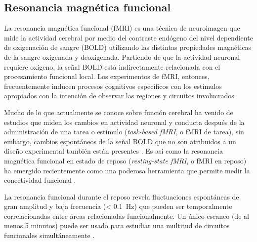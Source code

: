 \subsection{Resonancia magnética funcional}
La resonancia magnética funcional (fMRI) es una técnica de neuroimagen que mide la actividad cerebral por medio del contraste endógeno del nivel dependiente de oxigenación de sangre (BOLD) \parencite{Ogawa1993} utilizando las distintas propiedades magnéticas de la sangre oxigenada y deoxigenada.
Partiendo de que la actividad neuronal requiere oxígeno, la señal BOLD está indirectamente relacionada con el procesamiento funcional local.
Los experimentos de fMRI, entonces, frecuentemente inducen procesos cognitivos específicos con los estímulos apropiados con la intención de observar las regiones y circuitos involucrados. \par
Mucho de lo que actualmente se conoce sobre función cerebral ha venido de estudios que miden los cambios en actividad neuronal y conducta después de la administración de una tarea o estímulo (\textit{task-based fMRI}, o fMRI de tarea), sin embargo, cambios espontáneos de la señal BOLD que no son atribuidos a un diseño experimental también están presentes \parencite{Fox2007}.
Es así como la resonancia magnética funcional en estado de reposo (\textit{resting-state fMRI}, o fMRI en reposo) ha emergido recientemente como una poderosa herramienta que permite medir la conectividad funcional \parencite{Biswal2010}.\par
La resonancia funcional durante el reposo revela fluctuaciones espontáneas de gran amplitud y baja frecuencia (\deactivatequoting\SI{< 0.1}{\hertz}\activatequoting) que pueden ser temporalmente correlacionadas entre áreas relacionadas funcionalmente.
Un único escaneo (de al menos 5 minutos) puede ser usado para estudiar una multitud de circuitos funcionales simultáneamente \parencite{Biswal2010}.

